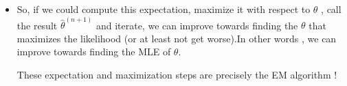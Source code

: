 \begin{itemize}
     \hspace{20 mm} d($\theta$\(|\)${\hat{\theta}}^{(n)}$) =$\int$ln(p(X\(|\)y,$\theta$)p(y\(|\)$\theta$)/p(y\(|\)X,${\hat{\theta}}^{(n)}$)p(X\(|\)${\hat{\theta}}^{(n)}$))(p(y\(|\)X,${\hat{\theta}}^{(n)}$))dy

     \hspace{9 mm}with respect to $\theta$ is equivalent to maximizing

     \hspace{40 mm} $\int$ln(p(X\(|\)y,$\theta$)p(y\(|\)$\theta$)(p(y\(|\)X,${\hat{\theta}}^{(n)}$))dy

     \hspace{9 mm}with respect to $\theta$.
     

     \hspace{9 mm}Note that this is

     \hspace{43 mm} $\int$ln(p(X,y\(|\)$\theta$))p(y\(|\)X,${\hat{\theta}}^{(n)}$)dy
     
     \hspace{9 mm}which is 
     
     \hspace{47 mm}  E_{Y}[\ln(p(X,Y\(|\)$\theta$))\(|\)X,${\hat{\theta}}^{(n)}$]

     
 \item So, if we could compute this expectation, maximize it with respect to $\theta$ , call the result ${\hat{\theta}}^{(n+1)}$ and iterate, we can improve towards finding the $\theta$ that maximizes the likelihood (or at least not get worse).In other words , we can improve towards finding the MLE of $\theta$.

 These expectation and maximization steps are precisely the EM algorithm !

    
\end{itemize}
